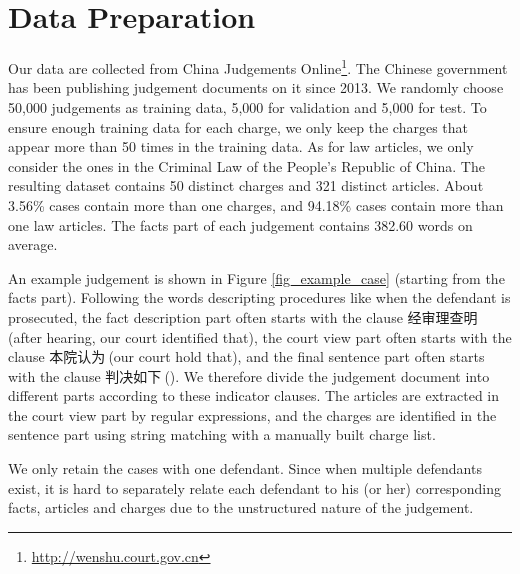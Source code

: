 \section{Data Preparation} 
Our data are collected from China Judgements Online\footnote{\url{http://wenshu.court.gov.cn}}. The Chinese government has been publishing judgement documents on it since 2013.
We randomly choose 50,000 judgements as training data, 5,000 for validation and 5,000 for test. To ensure enough training data for each charge, we only keep the charges that appear more than 50 times in the training data. As for law articles, we only consider the ones in the Criminal Law of the People's Republic of China. The resulting dataset contains 50 distinct charges and 321 distinct articles. About 3.56\% cases contain more than one charges, and 94.18\% cases contain more than one law articles. 
The facts part of each judgement contains 382.60 words on average.



An example judgement is shown in Figure \ref{fig_example_case} (starting from the facts part).
Following the words descripting procedures like when the defendant is prosecuted, the fact description part often starts with the clause 经审理查明$\ $(after hearing, our court identified that), the court view part often starts with the clause 本院认为$\ $(our court hold that), and the final sentence part often starts with the clause 判决如下$\ $(). 
We therefore divide the judgement document into different parts according to these indicator clauses. The articles are extracted in the court view part by regular expressions, and the charges are identified in the sentence part using string matching with a manually built charge list.

We only retain the cases with one defendant. Since when multiple defendants exist, it is hard to separately relate each defendant to his (or her) corresponding facts, articles and charges due to the unstructured nature of the judgement.


